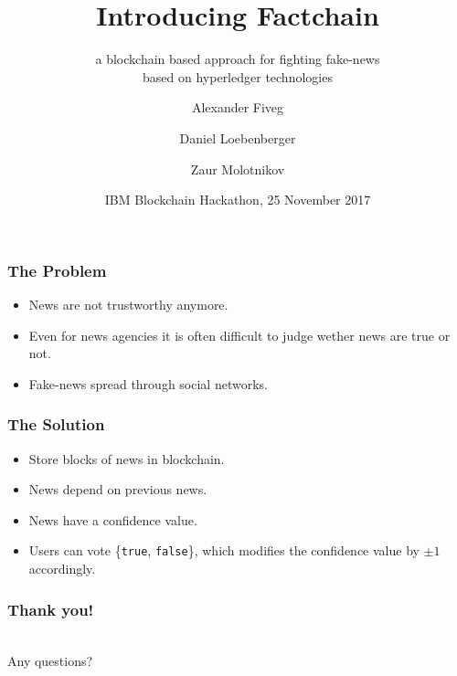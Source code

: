 \documentclass[aspectratio=169]{beamer}
\title{Introducing Factchain}
\subtitle{a blockchain based approach for fighting fake-news\\based on hyperledger technologies}
\author{Alexander Fiveg \and Daniel Loebenberger \and Zaur Molotnikov}
\institute{\texttt{\{afiveg,dloeb,zmolo\}@genua.de}}
\date{IBM Blockchain Hackathon, 25 November 2017}
\begin{document}
\frame[plain]{\titlepage}

\begin{frame}
\frametitle{The Problem}

\parbox{12cm}{
\begin{minipage}[c][6cm][c]{8cm}
\begin{itemize}
\item News are not trustworthy anymore.
\item Even for news agencies it is often difficult to judge wether news are true or not.
\item Fake-news spread through social networks. 
\end{itemize}
\end{minipage}
\hfill
\begin{minipage}[c][6cm][c]{3.5cm}
\end{minipage}
}
\end{frame}

\begin{frame}
\frametitle{The Solution}

\parbox{12cm}{
\begin{minipage}[c][6cm][c]{8cm}
\begin{itemize}
\item Store blocks of news in blockchain.
\item News depend on previous news.
\item News have a confidence value.
\item Users can vote \{\texttt{true}, \texttt{false}\}, which
      modifies the confidence value by $\pm 1$ accordingly.
\end{itemize}
\end{minipage}
\hfill
\begin{minipage}[c][6cm][c]{3.5cm}
\end{minipage}
}
\end{frame}

\begin{frame}
\frametitle{Thank you!}
\begin{center}
\\
Any questions?
\begin{center}
\end{center}
\end{center}
\end{frame}
\end{document}
